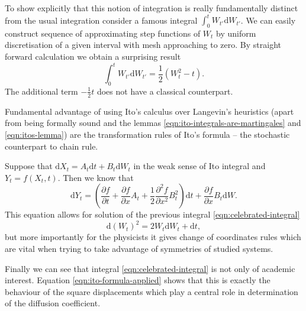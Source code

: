 \documentclass{doctoral}
\newcommand{\pd}{\partial}
\newcommand{\dd}{\mathrm{d}}
\begin{document}
To show explicitly that this notion of integration is really fundamentally distinct from the usual integration consider a famous integral $\int_0^t W_{t'} \dd W_{t'}$.
We can easily construct sequence of approximating step functions of $W_{t}$ by uniform discretisation of a given interval with mesh approaching to zero.
By straight forward calculation we obtain a surprising result
\begin{equation}
    \int_{0}^{t} W_{t'} \dd W_{t'} = \frac{1}{2} \left( W_t^2 - t \right).
    \label{eqn:celebrated-integral}
\end{equation}
The additional term $-\frac{1}{2}t$ does not have a classical counterpart.

Fundamental advantage of using Ito's calculus over Langevin's heuristics (apart from being formally sound and the lemmas \eqref{eqn:ito-integrals-are-martingales} and \eqref{eqn:itos-lemma}) are the transformation rules of Ito's formula -- the stochastic counterpart to chain rule.

Suppose that $\dd X_t = A_t \dd t + B_t \dd W_t$ in the weak sense of Ito integral and $Y_t = f(X_t,t)$.
Then we know that
\begin{equation}
    \dd Y_t = \left( \frac{\pd f}{\pd t} + \frac{\pd f}{\pd x} A_t + \frac{1}{2} \frac{\pd^2 f}{\pd x^2} B_t^2 \right) \dd t + \frac{\pd f}{\pd x} B_t \dd W.
    \label{eqn:itos-formula}
\end{equation}
This equation allows for solution of the previous integral \eqref{eqn:celebrated-integral}
\begin{equation}
    \dd (W_t)^2 = 2 W_t \dd W_t + \dd t, \label{eqn:ito-formula-applied}
\end{equation}
but more importantly for the physicists it gives change of coordinates rules which are vital when trying to take advantage of symmetries of studied systems.

Finally we can see that integral \eqref{eqn:celebrated-integral} is not only of academic interest.
Equation \eqref{eqn:ito-formula-applied} shows that this is exactly the behaviour of the square displacements which play a central role in determination of the diffusion coefficient.

\end{document}
